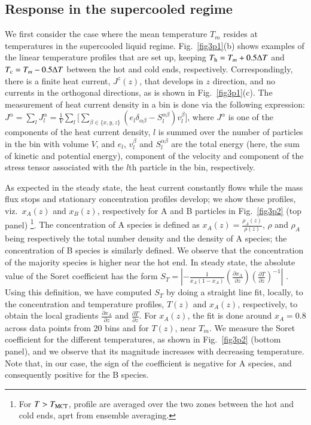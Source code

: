 \subsection{Response in the supercooled regime} 

We first consider the case where the mean temperature $T_m$ resides at temperatures in the supercooled liquid regime.  Fig.~\ref{fig3p1}(b) shows examples of the linear temperature profiles that are set up, keeping $T_{\rm h}=T_m+0.5\Delta{T}$ and $T_{\rm c}=T_m-0.5\Delta{T}$ between the hot and cold ends, respectively.  Correspondingly, there is a finite heat current, $J^z(z)$, that develops in $z$ direction, and no currents in the orthogonal directions, as is shown in Fig.~\ref{fig3p1}(c). The measurement of heat current density in a bin is done via the following expression: 
$J^{\alpha} = \sum_l J^{\alpha}_l = \frac{1}{V} \sum_{l} \Big[ \sum_{\beta \in \{x, y, z\}} (e_l \delta_{\alpha \beta}  - S^{\alpha \beta}_l)v^{\beta}_l \Big]$,
where $J^{\alpha}$ is one of the components of the heat current density, $l$ is summed over the number of particles in the bin with volume $V$,  and $e_l$, $v^{\beta}_l$ and  $S^{\alpha \beta}_l$  are the total energy (here, the sum of kinetic and potential energy), component of the velocity  and component of the stress tensor associated with the $l${th} particle in the bin, respectively.

As expected in the steady state, the heat current constantly flows while the mass flux stops and stationary concentration profiles develop; we show these profiles, viz.~$x_A(z)$ and $x_B(z)$, respectively for A and B particles in Fig.~\ref{fig3p2} (top panel) \footnote{For $T>T_{\rm MCT}$, profile are averaged over the two zones between the hot and cold ends, aprt from ensemble averaging.}.  {The concentration of A species is defined as $x_A(z)=\frac{\rho_A(z)}{\rho(z)}$,  $\rho$ and $\rho_A$ being respectively the total number density and the density of A species; the concentration of B species is similarly defined.} We observe that the concentration of the majority species is higher near the hot end. In steady state, the absolute value of the Soret coefficient has the form  $S_T= \left|-\frac{1}{x_A(1-x_A)}(\frac{\partial{x_A}}{\partial{z}})(\frac{\partial{T}}{\partial{z}})^{-1}\right|$ \cite{reith, degroot}. Using this definition, we have computed $S_T$ by doing a straight line fit, locally, to the concentration and temperature profiles, $T(z)$ and $x_A(z)$, respectively, to obtain the local gradients $\frac{\partial{x_A}}{\partial{z}}$ and $\frac{\partial{T}}{\partial{z}}$.  For $x_A(z)$, the fit is done around $x_A=0.8$ across data points from 20 bins and for $T(z)$, near $T_m$. We measure the Soret coefficient for the different temperatures,  as shown in Fig.~\ref{fig3p2} (bottom panel), and we observe that its magnitude increases with decreasing temperature. Note that, in our case, the sign of the coefficient is negative for A species, and consequently positive for the B species.

